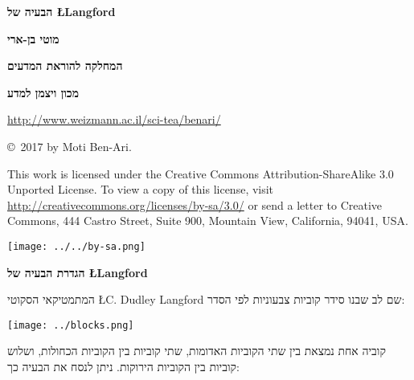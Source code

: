 \documentclass[12pt,a4paper]{article}
\begin{document}
\thispagestyle{empty}


\begin{center}
\textbf{\Huge הבעיה של
\L{Langford}}

\bigskip
\bigskip

\textbf{\Large מוטי בן-ארי}

\bigskip

\textbf{\Large המחלקה להוראת המדעים}

\bigskip

\textbf{\Large מכון ויצמן למדע}

\bigskip

\url{http://www.weizmann.ac.il/sci-tea/benari/}

\bigskip

\end{center}


\begin{center}
\copyright{}\  2017 by Moti Ben-Ari.
\end{center}

\begin{footnotesize}
This work is licensed under the Creative Commons Attribution-ShareAlike 3.0 Unported License. To view a copy of this license, visit \url{http://creativecommons.org/licenses/by-sa/3.0/} or send a letter to Creative Commons, 444 Castro Street, Suite 900, Mountain View, California, 94041, USA.
\end{footnotesize}

\bigskip

\begin{center}
\texttt{[image: ../../by-sa.png]}
\end{center}

\bigskip

\newpage

\begin{center}
\textbf{\Large הגדרת הבעיה של
\L{Langford}
}
\end{center}

המתמטיקאי הסקוטי
\L{C. Dudley Langford}
שם לב שבנו סידר קוביות צבעוניות לפי הסדר:
\begin{center}
\texttt{[image: ../blocks.png]}
\end{center}
קוביה אחת נמצאת בין שתי הקוביות האדומות, שתי קוביות בין הקוביות הכחולות, ושלוש קוביות בין הקוביות הירוקות. ניתן לנסח את הבעיה כך:
\end{document}
